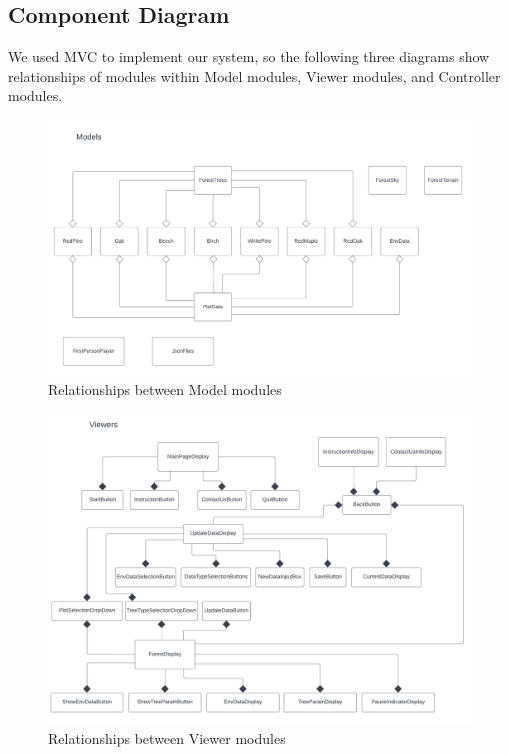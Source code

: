 \documentclass[12pt, titlepage]{article}
\begin{document}
\newpage

\subsection{Component Diagram}
We used MVC to implement our system, so the following three diagrams show relationships of
modules within Model modules, Viewer modules, and Controller modules.

\begin{figure}[H]
\caption{Relationships between Model modules}
\includegraphics[scale=0.65]{SysDesPic/Model-Modules.png}
\end{figure}

\newpage

\begin{figure}[H]
\caption{Relationships between Viewer modules}
\includegraphics[scale=0.65]{SysDesPic/Viewer-Modules.png}
\end{figure}
\end{document}
